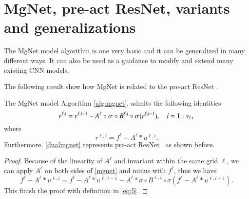 
\section{MgNet, pre-act ResNet, variants and generalizations}\label{sec:relation}
The MgNet model algorithm is one very basic and it can be generalized
in many different ways. It can also be used as a guidance to modify and 
extend many existing CNN models. 

The following result show how MgNet is related to the pre-act ResNet \cite{he2016identity}. 
\begin{theorem}\label{thm:mgnet1}
The MgNet model Algorithm \ref{alg:mgnet}, 
admits the following identities
\begin{equation}\label{dualmgnet}
r^{\ell, i} = r^{\ell, i-1} -  A^{\ell} \circ \sigma \circ B^{\ell,i}\circ \sigma (r^{\ell,i-1}), \quad i = 1:\nu_\ell, \\
\end{equation}
where
\begin{equation}
  \label{eq:5}
	r^{\ell,i} = f^{\ell} - A^{\ell} \ast u^{\ell,i}.   
\end{equation}
Furthermore, \eqref{dualmgnet} represents pre-act ResNet~\cite{he2016identity} 
as shown before.
\end{theorem}

\begin{proof}
	Because of the linearity of $A^\ell$ and invariant within the same grid $\ell$, 
	we can apply $A^\ell$ on both sides of \eqref{mgnet} and minus with
	$f^\ell$, thus we have
	$$
	f^{\ell} - A^{\ell} \ast u^{\ell,i} = f^{\ell} - A^\ell \ast u^{\ell,i-1} -
	A^{\ell} \ast \sigma \circ B^{\ell,i}\circ \sigma (f^\ell - A^\ell \ast u^{\ell,i-1}).
	$$
This finish the proof with definition in \eqref{eq:5}.
\end{proof}

